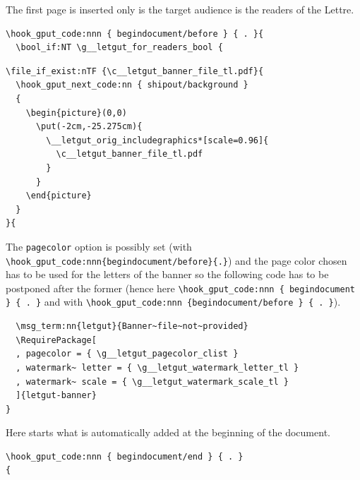 \documentclass{letgut}
\begin{document}
The first page is inserted only is the target audience is the readers of the
Lettre.

\begin{lstlisting}
\hook_gput_code:nnn { begindocument/before } { . }{
  \bool_if:NT \g__letgut_for_readers_bool {
\end{lstlisting}

\begin{lstlisting}
\file_if_exist:nTF {\c__letgut_banner_file_tl.pdf}{
  \hook_gput_next_code:nn { shipout/background }
  {
    \begin{picture}(0,0)
      \put(-2cm,-25.275cm){
        \__letgut_orig_includegraphics*[scale=0.96]{
          \c__letgut_banner_file_tl.pdf
        }
      }
    \end{picture}
  }
}{
\end{lstlisting}

The \lstinline+pagecolor+ option is possibly set (with
\lstinline+\hook_gput_code:nnn{begindocument/before}{.}+) and the page color chosen has to
be used for the letters of the banner so the following code has to be postponed
after the former (hence here \lstinline+\hook_gput_code:nnn { begindocument } { . }+ and
with \lstinline+\hook_gput_code:nnn {begindocument/before } { . }+).

\begin{lstlisting}
  \msg_term:nn{letgut}{Banner~file~not~provided}
  \RequirePackage[
  , pagecolor = { \g__letgut_pagecolor_clist }
  , watermark~ letter = { \g__letgut_watermark_letter_tl }
  , watermark~ scale = { \g__letgut_watermark_scale_tl }
  ]{letgut-banner}
}
\end{lstlisting}

Here starts what is automatically added at the beginning of the document.

\begin{lstlisting}
\hook_gput_code:nnn { begindocument/end } { . }
{
\end{lstlisting}
\end{document}
